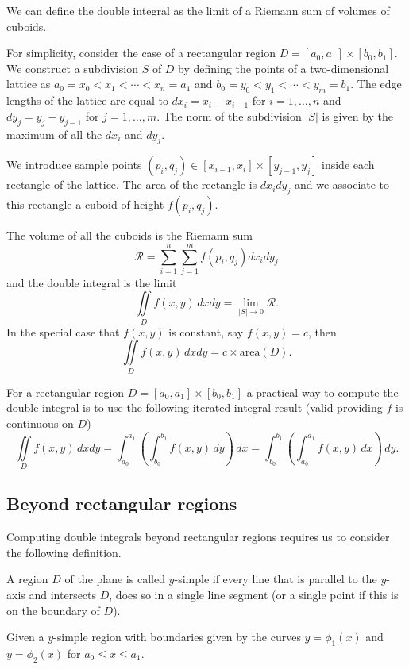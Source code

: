 \documentclass[10pt, a4paper]{article}
\begin{document}
We can define the double integral as the limit of a Riemann sum of volumes of cuboids.

For simplicity,
consider the case of a rectangular region $D = [a_0, a_1] \times [b_0, b_1]$.
We construct a subdivision $S$ of $D$ by defining the points of a two-dimensional lattice as $a_0 = x_0 < x_1 < \dotsi < x_n = a_1$ and $b_0 = y_0 < y_1 < \dotsi < y_m = b_1$.
The edge lengths of the lattice are equal to $dx_i = x_i - x_{i - 1}$ for $i = 1, \dotsc, n$ and $dy_j = y_j - y_{j - 1}$ for $j = 1, \dotsc, m$.
The norm of the subdivision $|S|$ is given by the maximum of all the $dx_i$ and $dy_j$.

We introduce sample points $(p_i, q_j) \in [x_{i - 1}, x_i] \times [y_{j - 1}, y_j]$ inside each rectangle of the lattice.
The area of the rectangle is $dx_idy_j$ and we associate to this rectangle a cuboid of height $f(p_i, q_j)$.

The volume of all the cuboids is the Riemann sum
\[
\mathcal{R} = \sum_{i = 1}^{n}\sum_{j = 1}^{m}f(p_i, q_j)dx_idy_j
\]
and the double integral is the limit
\[
\iint\limits_Df(x, y)\,dxdy = \lim_{|S| \rightarrow 0}\mathcal{R}.
\]
In the special case that $f(x, y)$ is constant,
say $f(x, y) = c$,
then
\[
\iint\limits_Df(x, y)\,dxdy = c \times \mathrm{area}(D).
\]

For a rectangular region $D = [a_0, a_1] \times [b_0, b_1]$ a practical way to compute the double integral is to use the following iterated integral result
(valid providing $f$ is continuous on $D$)
\[
\iint\limits_Df(x, y)\,dxdy = \int_{a_0}^{a_1}\left(\int_{b_0}^{b_1}f(x, y)\,dy\right)\,dx = \int_{b_0}^{b_1}\left(\int_{a_0}^{a_1}f(x, y)\,dx\right)\,dy.
\]

\subsection{Beyond rectangular regions}
Computing double integrals beyond rectangular regions requires us to consider the following definition.
\begin{definition}
    A region $D$ of the plane is called $y$-simple if every line that is parallel to the $y$-axis and intersects $D$,
    does so in a single line segment
    (or a single point if this is on the boundary of $D$).
\end{definition}

Given a $y$-simple region with boundaries given by the curves $y = \phi_1(x)$ and $y = \phi_2(x)$ for $a_0 \leq x \leq a_1$.
\end{document}
